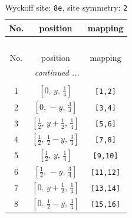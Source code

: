 \documentclass[fleqn,8pt]{jsarticle}
\begin{document}
\begin{longtable}{ccc}
\caption{Wyckoff site: {\tt 8e}, site symmetry: {\tt 2}}
 \\
 \hline \hline
No. & position & mapping \\ \hline \endfirsthead

\multicolumn{2}{l}{\tablename\ \thetable{}} \\
 \hline \hline
No. & position & mapping \\ \hline \endhead

 \hline \hline
\multicolumn{2}{r}{\footnotesize\it continued ...} \\ \endfoot

 \hline \hline
\multicolumn{2}{r}{} \\ \endlastfoot

1 & $\left[ 0,\, y,\, \frac{1}{4} \right]$ & {\tt [1,2]} \\ \hline
2 & $\left[ 0,\, - y,\, \frac{3}{4} \right]$ & {\tt [3,4]} \\ \hline
3 & $\left[ \frac{1}{2},\, y + \frac{1}{2},\, \frac{1}{4} \right]$ & {\tt [5,6]} \\ \hline
4 & $\left[ \frac{1}{2},\, \frac{1}{2} - y,\, \frac{3}{4} \right]$ & {\tt [7,8]} \\ \hline
5 & $\left[ \frac{1}{2},\, y,\, \frac{1}{4} \right]$ & {\tt [9,10]} \\ \hline
6 & $\left[ \frac{1}{2},\, - y,\, \frac{3}{4} \right]$ & {\tt [11,12]} \\ \hline
7 & $\left[ 0,\, y + \frac{1}{2},\, \frac{1}{4} \right]$ & {\tt [13,14]} \\ \hline
8 & $\left[ 0,\, \frac{1}{2} - y,\, \frac{3}{4} \right]$ & {\tt [15,16]} \\
\end{longtable}
\renewcommand{\arraystretch}{1.2}
\end{document}
